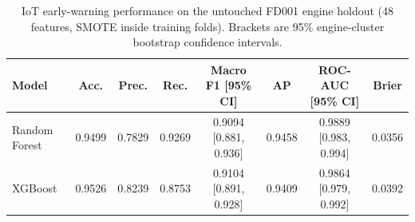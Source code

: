 \begin{table}[H]
\centering
\caption{IoT early-warning performance on the untouched FD001 engine holdout
(48 features, SMOTE inside training folds). Brackets are 95\% engine-cluster bootstrap
confidence intervals.}
\label{tab:iot-models}
\small
\begin{tabular}{lccccccc}
\toprule
Model & Acc. & Prec. & Rec. & Macro F1 [95\% CI] & AP & ROC-AUC [95\% CI] & Brier \\
\midrule
Random Forest & 0.9499 & 0.7829 & 0.9269 & 0.9094 [0.881, 0.936] & 0.9458 & 0.9889 [0.983, 0.994] & 0.0356 \\
XGBoost & 0.9526 & 0.8239 & 0.8753 & 0.9104 [0.891, 0.928] & 0.9409 & 0.9864 [0.979, 0.992] & 0.0392 \\
\bottomrule
\end{tabular}
\end{table}
